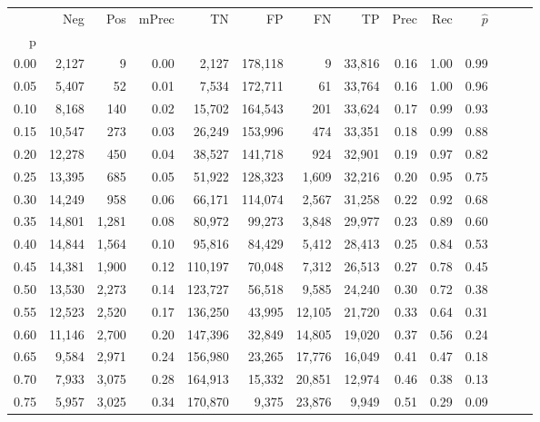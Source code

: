 \begin{tabular}{rrrrrrrrrrrrrr}
\toprule
{} &     Neg &    Pos & mPrec &       TN &       FP &      FN &      TP &  Prec &   Rec & $\hat{p}$ \\
p    &         &        &       &          &          &         &         &       &       &           \\
\midrule
0.00 &   2,127 &      9 &  0.00 &    2,127 &  178,118 &       9 &  33,816 &  0.16 &  1.00 &      0.99 \\
0.05 &   5,407 &     52 &  0.01 &    7,534 &  172,711 &      61 &  33,764 &  0.16 &  1.00 &      0.96 \\
0.10 &   8,168 &    140 &  0.02 &   15,702 &  164,543 &     201 &  33,624 &  0.17 &  0.99 &      0.93 \\
0.15 &  10,547 &    273 &  0.03 &   26,249 &  153,996 &     474 &  33,351 &  0.18 &  0.99 &      0.88 \\
0.20 &  12,278 &    450 &  0.04 &   38,527 &  141,718 &     924 &  32,901 &  0.19 &  0.97 &      0.82 \\
0.25 &  13,395 &    685 &  0.05 &   51,922 &  128,323 &   1,609 &  32,216 &  0.20 &  0.95 &      0.75 \\
0.30 &  14,249 &    958 &  0.06 &   66,171 &  114,074 &   2,567 &  31,258 &  0.22 &  0.92 &      0.68 \\
0.35 &  14,801 &  1,281 &  0.08 &   80,972 &   99,273 &   3,848 &  29,977 &  0.23 &  0.89 &      0.60 \\
0.40 &  14,844 &  1,564 &  0.10 &   95,816 &   84,429 &   5,412 &  28,413 &  0.25 &  0.84 &      0.53 \\
0.45 &  14,381 &  1,900 &  0.12 &  110,197 &   70,048 &   7,312 &  26,513 &  0.27 &  0.78 &      0.45 \\
0.50 &  13,530 &  2,273 &  0.14 &  123,727 &   56,518 &   9,585 &  24,240 &  0.30 &  0.72 &      0.38 \\
0.55 &  12,523 &  2,520 &  0.17 &  136,250 &   43,995 &  12,105 &  21,720 &  0.33 &  0.64 &      0.31 \\
0.60 &  11,146 &  2,700 &  0.20 &  147,396 &   32,849 &  14,805 &  19,020 &  0.37 &  0.56 &      0.24 \\
0.65 &   9,584 &  2,971 &  0.24 &  156,980 &   23,265 &  17,776 &  16,049 &  0.41 &  0.47 &      0.18 \\
0.70 &   7,933 &  3,075 &  0.28 &  164,913 &   15,332 &  20,851 &  12,974 &  0.46 &  0.38 &      0.13 \\
0.75 &   5,957 &  3,025 &  0.34 &  170,870 &    9,375 &  23,876 &   9,949 &  0.51 &  0.29 &      0.09 \\

\end{tabular}
